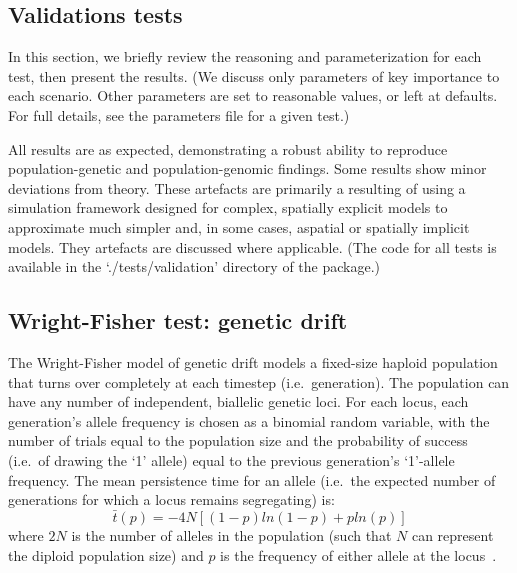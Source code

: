 ﻿\documentclass{article}
\begin{document}
\subsection{Validations tests}
In this section, we briefly review the reasoning and parameterization for each test,
then present the results.
(We discuss only parameters of key importance to each scenario.
Other parameters are set to reasonable values, or left at defaults.
For full details, see the parameters file for a given test.)

All results are as expected, demonstrating a robust ability to reproduce 
population-genetic and population-genomic findings.
Some results show minor deviations from theory.
These artefacts are primarily a resulting of using a simulation framework
designed for complex, spatially explicit models 
to approximate much simpler and, in some cases, aspatial or spatially implicit models.
They artefacts are discussed where applicable.
(The code for all tests is available in the `./tests/validation' directory of the package.)

\subsection{Wright-Fisher test: genetic drift}
The Wright-Fisher model of genetic drift models a fixed-size haploid population that
turns over completely at each timestep (i.e.\ generation).
The population can have any number of independent, biallelic genetic loci.
For each locus, each generation’s allele
frequency is chosen as a binomial random variable, with the number of trials equal to
the population size and the probability of success (i.e.\ of drawing the ‘1’ allele)
equal to the previous generation’s ‘1’-allele frequency.
The mean persistence time for an allele 
(i.e.\ the expected number of generations for which a locus remains segregating) 
is:
\begin{equation}
        \bar{t}(p) = -4N[(1 - p)ln(1 - p) + pln(p)]
\label{eqxn:wf_mean_persist_t}
\end{equation}
where $2N$ is the number of alleles in the population (such that $N$ can
represent the diploid population size) and $p$ is the frequency of either allele
at the locus~\cite{wright,fisher,hartl}.
\end{document}
